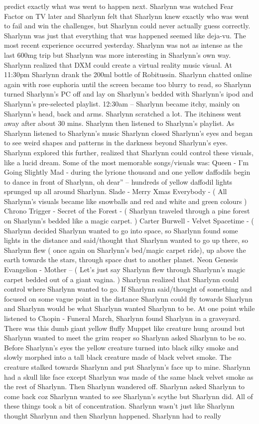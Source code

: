 \documentclass[12pt]{book}
\begin{document}
predict exactly what was went to happen next. Sharlynn was watched Fear Factor on TV later and Sharlynn felt that Sharlynn knew exactly who was went to fail and win the challenges, but Sharlynn could never actually guess correctly. Sharlynn was just that everything that was happened seemed like deja-vu. The most recent experience occurred yesterday. Sharlynn was not as intense as the last 600mg trip but Sharlynn was more interesting in Sharlynn's own way. Sharlynn realized that DXM could create a virtual reality music visual. At 11:30pm Sharlynn drank the 200ml bottle of Robitussin. Sharlynn chatted online again with rose euphoria until the screen became too blurry to read, so Sharlynn turned Sharlynn's PC off and lay on Sharlynn's bedded with Sharlynn's ipod and Sharlynn's pre-selected playlist. 12:30am -- Sharlynn became itchy, mainly on Sharlynn's head, back and arms. Sharlynn scratched a lot. The itchiness went away after about 30 mins. Sharlynn then listened to Sharlynn's playlist. As Sharlynn listened to Sharlynn's music Sharlynn closed Sharlynn's eyes and began to see weird shapes and patterns in the darkness beyond Sharlynn's eyes. Sharlynn explored this further, realized that Sharlynn could control these visuals, like a lucid dream. Some of the most memorable songs/visuals was: Queen - I'm Going Slightly Mad - during the lyrione thousand and one yellow daffodils begin to dance in front of Sharlynn, oh dear'' -- hundreds of yellow daffodil lights sprunged up all around Sharlynn. Slade - Merry Xmas Everybody - ( All Sharlynn's visuals became like snowballs and red and white and green colours ) Chrono Trigger - Secret of the Forest - ( Sharlynn traveled through a pine forest on Sharlynn's bedded like a magic carpet. ) Carter Burwell - Velvet Spacetime - ( Sharlynn decided Sharlynn wanted to go into space, so Sharlynn found some lights in the distance and said/thought that Sharlynn wanted to go up there, so Sharlynn flew ( once again on Sharlynn's bed/magic carpet ride), up above the earth towards the stars, through space dust to another planet. Neon Genesis Evangelion - Mother -- ( Let's just say Sharlynn flew through Sharlynn's magic carpet bedded out of a giant vagina. ) Sharlynn realized that Sharlynn could control where Sharlynn wanted to go. If Sharlynn said/thought of something and focused on some vague point in the distance Sharlynn could fly towards Sharlynn and Sharlynn would be what Sharlynn wanted Sharlynn to be. At one point while listened to Chopin - Funeral March, Sharlynn found Sharlynn in a graveyard. There was this dumb giant yellow fluffy Muppet like creature hung around but Sharlynn wanted to meet the grim reaper so Sharlynn asked Sharlynn to be so. Before Sharlynn's eyes the yellow creature turned into black silky smoke and slowly morphed into a tall black creature made of black velvet smoke. The creature stalked towards Sharlynn and put Sharlynn's face up to mine. Sharlynn had a skull like face except Sharlynn was made of the same black velvet smoke as the rest of Sharlynn. Then Sharlynn wandered off. Sharlynn asked Sharlynn to come back coz Sharlynn wanted to see Sharlynn's scythe but Sharlynn did. All of these things took a bit of concentration. Sharlynn wasn't just like Sharlynn thought Sharlynn and then Sharlynn happened. Sharlynn had to really 
\end{document}
